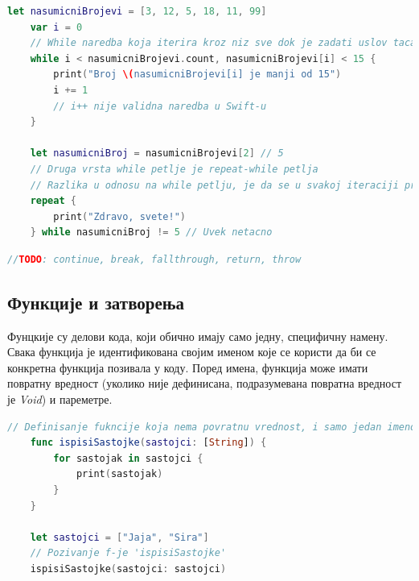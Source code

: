 \documentclass[12pt,oneside]{memoir}
\begin{document}
\begin{lstlisting}[caption=\textit{{While наредбa контроле тока}}, label={lst:While наредба контроле тока}, language=Swift, frame=single]
    let nasumicniBrojevi = [3, 12, 5, 18, 11, 99]
    var i = 0
    // While naredba koja iterira kroz niz sve dok je zadati uslov tacan
    while i < nasumicniBrojevi.count, nasumicniBrojevi[i] < 15 {
        print("Broj \(nasumicniBrojevi[i] je manji od 15")
        i += 1
        // i++ nije validna naredba u Swift-u
    }
    
    let nasumicniBroj = nasumicniBrojevi[2] // 5
    // Druga vrsta while petlje je repeat-while petlja
    // Razlika u odnosu na while petlju, je da se u svakoj iteraciji prvo izvrsi telo petlje, pa se nakon toga proveri uslov; Posledica toga je da ce telo biti izvrseno barem jednom
    repeat {
        print("Zdravo, svete!")
    } while nasumicniBroj != 5 // Uvek netacno
\end{lstlisting}

\begin{lstlisting}[caption=\textit{{Додаци наредбa контроле тока}}, label={lst:Додаци наредба контроле тока}, language=Swift, frame=single]
    //TODO: continue, break, fallthrough, return, throw
\end{lstlisting}

\subsection{Функције и затворења}

\indent Фунцкије су делови кода, који обично имају само једну, специфичну намену. Свака функција је идентификована својим именом које се користи да би се конкретна функција позивала у коду. Поред имена, функција може имати повратну вредност (уколико није дефинисана, подразумевана повратна вредност је \textit{Void}) и пареметре.

\begin{lstlisting}[caption=\textit{{Дефинисање и позивање функције са параметром}}, label={lst:Дефинисање и позивање функције са параметром}, language=Swift, frame=single]
    // Definisanje fukncije koja nema povratnu vrednost, i samo jedan imenovani parametar
    func ispisiSastojke(sastojci: [String]) {
        for sastojak in sastojci {
            print(sastojak)
        }
    }
    
    let sastojci = ["Jaja", "Sira"]
    // Pozivanje f-je 'ispisiSastojke'
    ispisiSastojke(sastojci: sastojci)
\end{lstlisting}
\end{document}
